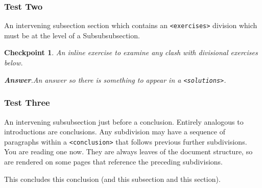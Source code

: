 \documentclass{sn-jnl}
\theoremstyle{thmstyleone}%
\theoremstyle{thmstyletwo}%
\newtheorem{inlineexercise}[theorem]{Checkpoint}
\theoremstyle{thmstylethree}%
\newcommand{\blocktitlefont}{\relax}
\newcommand{\mono}[1]{\texttt{#1}}
\numberwithin{equation}{section}
\begin{document}
\subsubsection{Test Two}\label{subsection-intro-conclude-4}%
An intervening subsection section which contains an \mono{<exercises>} division which must be at the level of a Subsubsubsection.%
\begin{inlineexercise}\label{subsection-intro-conclude-4-3}%
%
An inline exercise to examine any clash with divisional exercises below.%
\par\smallskip%
\noindent\textbf{\blocktitlefont Answer}.\hypertarget{subsection-intro-conclude-4-3-2}{}\quad{}An answer so there is something to appear in a \mono{<solutions>}.%
\end{inlineexercise}%
%
%
\typeout{************************************************}
\typeout{************************************************}
%
\subsubsection{Test Three}\label{subsection-intro-conclude-5}%
An intervening subsubsection just before a conclusion.%
Entirely analogous to introductions are conclusions.  Any subdivision may have a sequence of paragraphs within a \mono{<conclusion>} that follows previous further subdivisions.  You are reading one now.  They are always leaves of the document structure, so are rendered on some pages that reference the preceding subdivisions.%
\par
This concludes this conclusion (and this subsection and this section).%
%
%
\typeout{************************************************}
\typeout{************************************************}
%
\end{document}
